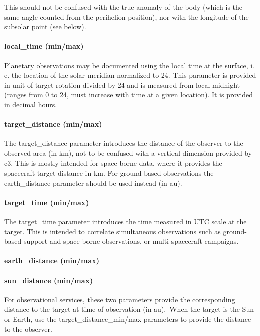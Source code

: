 \documentclass[11pt,a4paper]{ivoa}
\begin{document}
This should not be confused with the true anomaly of the body (which is the same angle counted from the perihelion position), nor with the longitude of the subsolar point (see below).

\paragraph{local\_time (min/max)}

Planetary observations may be documented using the local time at the surface, i. e. the location of the solar meridian normalized to 24. This parameter is provided in unit of target rotation divided by 24 and is measured from local midnight (ranges from 0 to 24, must increase with time at a given location). It is provided in decimal hours.

\paragraph{target\_distance (min/max)}

The target\_distance parameter introduces the distance of the observer to the observed area (in km), not to be confused with a vertical dimension provided by c3. This is mostly intended for space borne data, where it provides the spacecraft-target distance in km. For ground-based observations the earth\_distance parameter should be used instead (in au).

\paragraph{target\_time (min/max)}

The target\_time parameter introduces the time measured in UTC scale at the target. This is intended to correlate simultaneous observations such as ground-based support and space-borne observations, or multi-spacecraft campaigns.

\paragraph{earth\_distance (min/max)}

\paragraph{sun\_distance (min/max)}

For observational services, these two parameters provide the corresponding distance to the target at time of observation (in au). When the target is the Sun or Earth, use the target\_distance\_min/max parameters to provide the distance to the observer.
\end{document}
